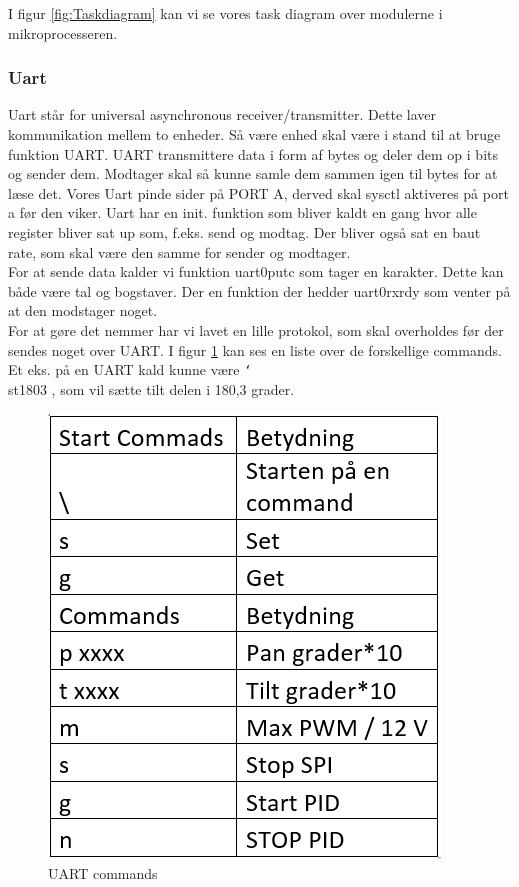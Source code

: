 I figur \ref{fig:Taskdiagram} kan vi se vores task diagram over modulerne i mikroprocesseren.

\subsubsection{Uart}

Uart står for universal asynchronous receiver/transmitter. Dette laver kommunikation mellem to enheder. Så være enhed skal være i stand til at bruge funktion UART. UART transmittere data i form af bytes og deler dem op i bits og sender dem. Modtager skal så kunne samle dem sammen igen til bytes for at læse det.
Vores Uart pinde sider på PORT A, derved skal sysctl aktiveres på port a før den viker. Uart har en init. funktion som bliver kaldt en gang hvor alle register bliver sat up som, f.eks. send og modtag. Der bliver også sat en baut rate, som skal være den samme for sender og modtager.
\\
For at sende data kalder vi funktion uart0\textunderscore putc som tager en karakter. Dette kan både være tal og bogstaver. Der en funktion der hedder uart0\textunderscore rx\textunderscore rdy som venter på at den modstager noget.
\\
For at gøre det nemmer har vi lavet en lille protokol, som skal overholdes før der sendes noget over UART. I figur \ref{fig:UARTCMD} kan ses en liste over de forskellige commands. Et eks. på en UART kald kunne være \texttt{\char`\\}st1803 , som vil sætte tilt delen i 180,3 grader.

\begin{figure}[ht]
			\begin{center}
			\includegraphics[scale=0.5]{Billeder/UARTCMD.png}
			\end{center}
			\caption{UART commands}
			\label{fig:UARTCMD}
\end{figure}

